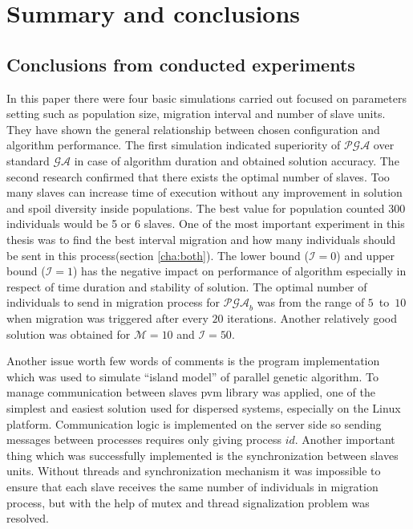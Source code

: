 \section{Summary and conclusions}
\label{cha:Summary}
\subsection{Conclusions from conducted experiments}
In this paper there were four basic simulations carried out focused on 
parameters setting such as population size, migration interval and number of slave units.
They have shown the general relationship between chosen
configuration and algorithm performance. The first simulation indicated
superiority of $\mathcal{PGA}$ over standard $\mathcal{GA}$ in case of algorithm
duration and obtained solution accuracy. The second research confirmed that
there exists the optimal number of slaves. Too many slaves can increase time of
execution without any improvement in solution and spoil diversity inside
populations. The best value for population
counted 300 individuals would be 5 or 6 slaves. One of the most important
experiment in this thesis was to find the best interval migration and how many
individuals should be sent in this process(section \ref{cha:both}). The lower bound
($\mathcal{I}=0$) and upper bound ($\mathcal{I}=1$) has the negative impact on
performance of algorithm especially in respect of time duration and stability of
solution.
The optimal number of individuals to send in migration process for
$\mathcal{PGA}_b$ was from the range of $5$~to~$10$ when migration was triggered after every $20$ 
iterations. Another relatively good solution was obtained for $\mathcal{M}=10$ and
$\mathcal{I}=50$. 

Another issue worth few words of comments is the program implementation which
was used to
simulate ``island model'' of parallel genetic algorithm. To manage communication
between slaves pvm library was applied, one of the simplest and
easiest solution used for dispersed systems, especially on the Linux platform.
Communication logic is implemented on the server side so sending messages
between processes requires only giving process $id$. Another important thing
which was successfully implemented is the synchronization between slaves units.
Without threads and synchronization mechanism it was impossible to ensure that
each slave receives the same number of individuals in migration process, but
with the help of mutex and thread signalization problem was resolved.

